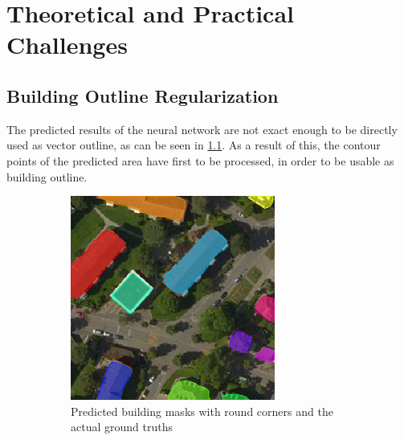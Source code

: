 
\chapter{Theoretical and Practical Challenges}

\section{Building Outline Regularization}
The predicted results of the neural network are not exact enough to be directly used as vector outline, as can be seen in \ref{fig:challenges:predicted_building_masks}. As a result of this, the contour points of the predicted area have first to be processed, in order to be usable as building outline.

\begin{figure}[H]
	\centering
	\begin{subfigure}{0.4\textwidth}
		\centering
    	\includegraphics[width=0.9\linewidth]{chapters/challenges/images/predicted_masks.png}		    \caption{Predicted building masks with round corners and the actual ground truths}
    	\label{fig:challenges:predicted_building_masks}
	\end{subfigure}~
	\begin{subfigure}{0.4\textwidth}
		\centering

\end{subfigure}
\end{figure}

